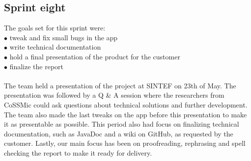 \subsection{Sprint eight}
The goals set for this sprint were:\\
$\bullet$\hspace{0.25cm} tweak and fix small bugs in the app\\
$\bullet$\hspace{0.25cm} write technical documentation\\
$\bullet$\hspace{0.25cm} hold a final presentation of the product for the customer\\
$\bullet$\hspace{0.25cm} finalize the report\\\\
The team held a presentation of the project at SINTEF on 23th of May. The presentation was followed by a Q \& A session where the researchers from CoSSMic could ask questions about technical solutions and further development. The team also made the last tweaks on the app before this presentation to make it as presentable as possible. This period also had focus on finalizing technical documentation, such as JavaDoc and a wiki on GitHub, as requested by the customer. Lastly, our main focus has been on proofreading, rephrasing and spell checking the report to make it ready for delivery.
